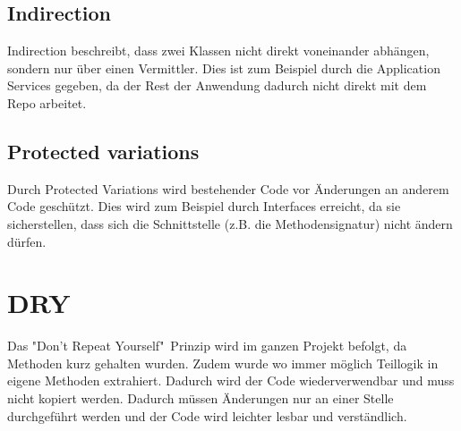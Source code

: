     \subsection{Indirection}
    Indirection beschreibt, dass zwei Klassen nicht direkt voneinander abhängen, sondern nur über einen Vermittler. Dies ist zum Beispiel durch die Application Services gegeben, da der Rest der Anwendung dadurch nicht direkt mit dem Repo arbeitet.
    
    \subsection{Protected variations}
    Durch Protected Variations wird bestehender Code vor Änderungen an anderem Code geschützt. Dies wird zum Beispiel durch Interfaces erreicht, da sie sicherstellen, dass sich die Schnittstelle (z.B. die Methodensignatur) nicht ändern dürfen.
    
\section{DRY}
Das "Don't Repeat Yourself"\ Prinzip wird im ganzen Projekt befolgt, da Methoden kurz gehalten wurden. Zudem wurde wo immer möglich Teillogik in eigene Methoden extrahiert. Dadurch wird der Code wiederverwendbar und muss nicht kopiert werden. Dadurch müssen Änderungen nur an einer Stelle durchgeführt werden und der Code wird leichter lesbar und verständlich.